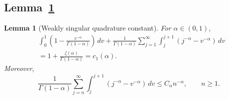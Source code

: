 \documentclass[letterpaper]{article}
\numberwithin{equation}{section}
\newtheorem{lemma}[theorem]{Lemma}
\theoremstyle{definition}
\theoremstyle{remark}
\begin{document}

\subsection{Lemma~\ref{lem:quadrature-c1}}\label{app:proof-quadrature-c1}

\begin{lemma}[Weakly singular quadrature constant]
\label{lem:quadrature-c1}
For $\alpha\in(0,1)$,
\begin{equation}\label{eq:quadrature-c1}
\begin{aligned}
  &\int_0^1\left(1-\frac{v^{-\alpha}}{\Gamma(1-\alpha)}\right)\,dv
  +
  \frac1{\Gamma(1-\alpha)}
  \sum_{j=1}^\infty\int_j^{j+1}(j^{-\alpha}-v^{-\alpha})\,dv\\
  &=
  1+\frac{\zeta(\alpha)}{\Gamma(1-\alpha)}
  =
  c_1(\alpha).
\end{aligned}
\end{equation}
Moreover,
\begin{equation}\label{eq:quadrature-c1-tail}
  \frac1{\Gamma(1-\alpha)}
  \sum_{j=n}^\infty\int_j^{j+1}(j^{-\alpha}-v^{-\alpha})\,dv
  \le C_\alpha n^{-\alpha},
  \qquad n\ge1.
\end{equation}
\end{lemma}
\end{document}
